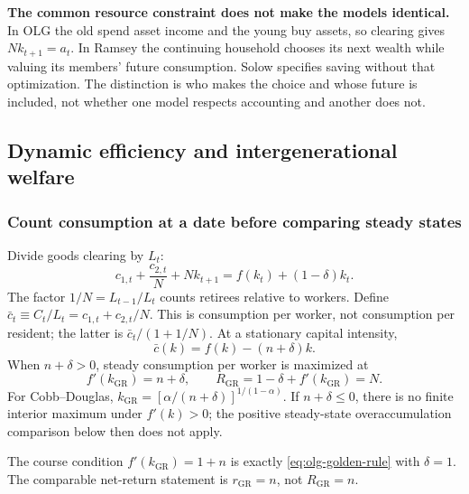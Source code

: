 \begin{blueblock}
\textbf{The common resource constraint does not make the models identical.}
In OLG the old spend asset income and the young buy assets, so clearing gives
$Nk_{t+1}=a_t$. In Ramsey the continuing household chooses its next wealth
while valuing its members' future consumption. Solow specifies saving without
that optimization. The distinction is who makes the choice and whose future
is included, not whether one model respects accounting and another does not.
\end{blueblock}

\subsection{Dynamic efficiency and intergenerational welfare}

\subsubsection{Count consumption at a date before comparing steady states}

Divide goods clearing by $L_t$:
\begin{equation}\label{eq:olg-resources}
c_{1,t}+\frac{c_{2,t}}{N}+Nk_{t+1}
=f(k_t)+(1-\delta)k_t.
\end{equation}
The factor $1/N=L_{t-1}/L_t$ counts retirees relative to workers. Define
$\bar c_t\equiv C_t/L_t=c_{1,t}+c_{2,t}/N$. This is consumption per worker,
not consumption per resident; the latter is $\bar c_t/(1+1/N)$.
At a stationary capital intensity,
\begin{equation}\label{eq:olg-steady-consumption}
\bar c(k)=f(k)-(n+\delta)k.
\end{equation}
When $n+\delta>0$, steady consumption per worker is maximized at
\begin{equation}\label{eq:olg-golden-rule}
f'(k_{\mathrm{GR}})=n+\delta,
\qquad R_{\mathrm{GR}}=1-\delta+f'(k_{\mathrm{GR}})=N.
\end{equation}
For Cobb--Douglas,
$k_{\mathrm{GR}}=[\alpha/(n+\delta)]^{1/(1-\alpha)}$.
If $n+\delta\leq0$, there is no finite interior maximum under $f'(k)>0$;
the positive steady-state overaccumulation comparison below then does not apply.

The course condition $f'(k_{\mathrm{GR}})=1+n$ is exactly
\eqref{eq:olg-golden-rule} with $\delta=1$. The comparable net-return statement
is $r_{\mathrm{GR}}=n$, not $R_{\mathrm{GR}}=n$.

